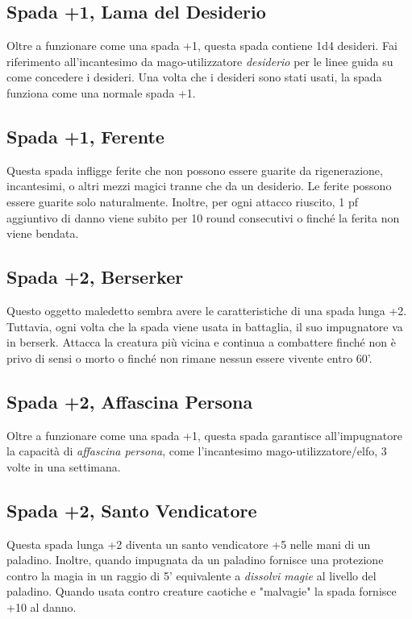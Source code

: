 \documentclass{article}
\begin{document}
\begin{multicols}{2}
\subsection{Spada +1, Lama del Desiderio}
Oltre a funzionare come una spada +1, questa spada contiene 1d4 desideri. Fai riferimento all'incantesimo da mago-utilizzatore \textit{desiderio} per le linee guida su come concedere i desideri. Una volta che i desideri sono stati usati, la spada funziona come una normale spada +1.

\subsection{Spada +1, Ferente}
Questa spada infligge ferite che non possono essere guarite da rigenerazione, incantesimi, o altri mezzi magici tranne che da un desiderio. Le ferite possono essere guarite solo naturalmente. Inoltre, per ogni attacco riuscito, 1 pf aggiuntivo di danno viene subito per 10 round consecutivi o finché la ferita non viene bendata.

\subsection{Spada +2, Berserker}
Questo oggetto maledetto sembra avere le caratteristiche di una spada lunga +2. Tuttavia, ogni volta che la spada viene usata in battaglia, il suo impugnatore va in berserk. Attacca la creatura più vicina e continua a combattere finché non è privo di sensi o morto o finché non rimane nessun essere vivente entro 60'.

\subsection{Spada +2, Affascina Persona}
Oltre a funzionare come una spada +1, questa spada garantisce all'impugnatore la capacità di \textit{affascina persona}, come l'incantesimo mago-utilizzatore/elfo, 3 volte in una settimana.

\subsection{Spada +2, Santo Vendicatore}
Questa spada lunga +2 diventa un santo vendicatore +5 nelle mani di un paladino. Inoltre, quando impugnata da un paladino fornisce una protezione contro la magia in un raggio di 5' equivalente a \textit{dissolvi magie} al livello del paladino. Quando usata contro creature caotiche e "malvagie" la spada fornisce +10 al danno.


\end{multicols}
\end{document}
